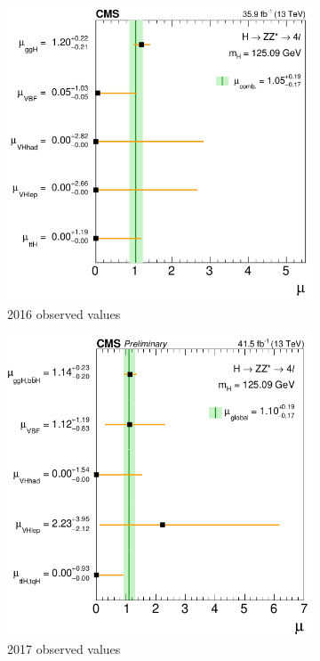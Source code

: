 \begin{figure}[h]
     \centering
     \begin{subfigure}[b]{0.3\textwidth}
         \includegraphics[width=\textwidth]{images/ssm2016.png}
         \caption{2016 observed values}
     \end{subfigure}
      \hfill
     \begin{subfigure}[b]{0.3\textwidth}
         \includegraphics[width=\textwidth]{images/2017ssm.png}
         \caption{2017 observed values}
     \end{subfigure}
      \hfill
     \begin{subfigure}[b]{0.3\textwidth}
         

\end{subfigure}
\end{figure}

